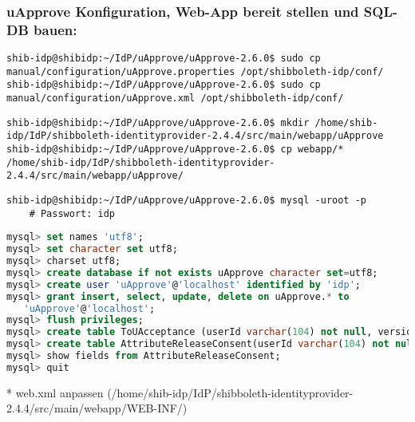 \subsubsection*{uApprove Konfiguration, Web-App bereit stellen und SQL-DB
bauen:} 
\begin{lstlisting}
shib-idp@shibidp:~/IdP/uApprove/uApprove-2.6.0$ sudo cp manual/configuration/uApprove.properties /opt/shibboleth-idp/conf/
shib-idp@shibidp:~/IdP/uApprove/uApprove-2.6.0$ sudo cp manual/configuration/uApprove.xml /opt/shibboleth-idp/conf/
\end{lstlisting}
\begin{lstlisting}
shib-idp@shibidp:~/IdP/uApprove/uApprove-2.6.0$ mkdir /home/shib-idp/IdP/shibboleth-identityprovider-2.4.4/src/main/webapp/uApprove
shib-idp@shibidp:~/IdP/uApprove/uApprove-2.6.0$ cp webapp/* /home/shib-idp/IdP/shibboleth-identityprovider-2.4.4/src/main/webapp/uApprove/
\end{lstlisting}
\begin{lstlisting}
shib-idp@shibidp:~/IdP/uApprove/uApprove-2.6.0$ mysql -uroot -p
	# Passwort: idp
\end{lstlisting}
\begin{lstlisting}[language=sql]
mysql> set names 'utf8';
mysql> set character set utf8;
mysql> charset utf8;
mysql> create database if not exists uApprove character set=utf8;
mysql> create user 'uApprove'@'localhost' identified by 'idp';
mysql> grant insert, select, update, delete on uApprove.* to 
   'uApprove'@'localhost';
mysql> flush privileges;
mysql> create table ToUAcceptance (userId varchar(104) not null, version varchar(104) not null, fingerprint varchar(256) not null, acceptanceDate timestamp default current_timestamp not null, primary key (userId,version));
mysql> create table AttributeReleaseConsent(userId varchar(104) not null, relyingPartyId varchar(104) not null, attributeId varchar(104) not null, valuesHash varchar(256) not null, consentDate timestamp default current_timestamp not null, primary key (userId, relyingPartyId, attributeId));
mysql> show fields from AttributeReleaseConsent;
mysql> quit
\end{lstlisting}
* web.xml anpassen (/home/shib-idp/IdP/shibboleth-identityprovider-2.4.4/src/main/webapp/WEB-INF/)

